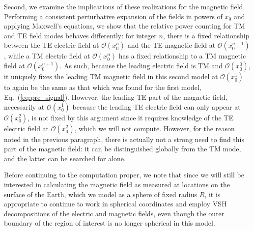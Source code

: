 \documentclass[amsmath,amssymb,aps,10pt,prd,letterpaper,nofootinbib,balancelastpage,notitlepage,superscriptaddress,twocolumn,floatfix]{revtex4-2}
\renewcommand{\eqref}[2][]{Eq{#1}.~(\ref{eq:#2})}	%
\begin{document}
Second, we examine the implications of these realizations for the magnetic field.
Performing a consistent perturbative expansion of the fields in powers of $x_0$ and applying Maxwell's equations, we show that the relative power counting for TM and TE field modes behaves differently: for integer $n$, there is a fixed relationship between the TE electric field at $\mathcal{O}(x_0^n)$ and the TE magnetic field at $\mathcal{O}(x_0^{n-1})$, while a TM electric field at $\mathcal{O}(x_0^n)$ has a fixed relationship to a TM magnetic field at $\mathcal{O}(x_0^{n+1})$.
As such, because the leading electric field is TM and $\mathcal{O}(x_0^0)$, it uniquely fixes the leading TM magnetic field in this second model at $\mathcal{O}(x_0^1)$ to again be the same as that which was found for the first model, \eqref{pre_signal}. 
However, the leading TE part of the magnetic field, necessarily at $\mathcal{O}(x_0^1)$ because the leading TE electric field can only appear at $\mathcal{O}(x_0^2)$, is not fixed by this argument since it requires knowledge of the TE electric field at $\mathcal{O}(x_0^2)$, which we will not compute.
However, for the reason noted in the previous paragraph, there is actually not a strong need to find this part of the magnetic field: it can be distinguished globally from the TM mode, and the latter can be searched for alone.

Before continuing to the computation proper, we note that since we will still be interested in calculating the magnetic field as measured at locations on the surface of the Earth, which we model as a sphere of fixed radius $R$, it is appropriate to continue to work in spherical coordinates and employ VSH decompositions of the electric and magnetic fields, even though the outer boundary of the region of interest is no longer spherical in this model.
\end{document}
